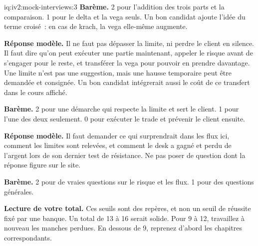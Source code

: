 \begin{solution}{iq:iv2:mock-interviews:3}
\textbf{Barème.} 2 pour l'addition des trois parts et la comparaison. 1 pour le delta et la vega seuls. Un bon candidat ajoute l'idée du terme croisé~: en cas de krach, la vega elle-même augmente.

\ivstop
\textbf{Réponse modèle.} Il ne faut pas dépasser la limite, ni perdre le client en silence. Il faut dire qu'on peut exécuter une partie maintenant, appeler le risque avant de s'engager pour le reste, et transférer la vega pour pouvoir en prendre davantage. Une limite n'est pas une suggestion, mais une hausse temporaire peut être demandée et consignée. Un bon candidat intégrerait aussi le coût de ce transfert dans le cours affiché.

\textbf{Barème.} 2 pour une démarche qui respecte la limite et sert le client. 1 pour l'une des deux seulement. 0 pour exécuter le trade et prévenir le client ensuite.

\ivstop
\textbf{Réponse modèle.} Il faut demander ce qui surprendrait dans les flux ici, comment les limites sont relevées, et comment le desk a gagné et perdu de l'argent lors de son dernier test de résistance. Ne pas poser de question dont la réponse figure sur le site.

\textbf{Barème.} 2 pour de vraies questions sur le risque et les flux. 1 pour des questions générales.

\medskip
\textbf{Lecture de votre total.} Ces seuils sont des repères, et non un seuil de réussite fixé par une banque. Un total de 13 à 16 serait solide. Pour 9 à 12, travaillez à nouveau les manches perdues. En dessous de 9, reprenez d'abord les chapitres correspondants.

\end{solution}

